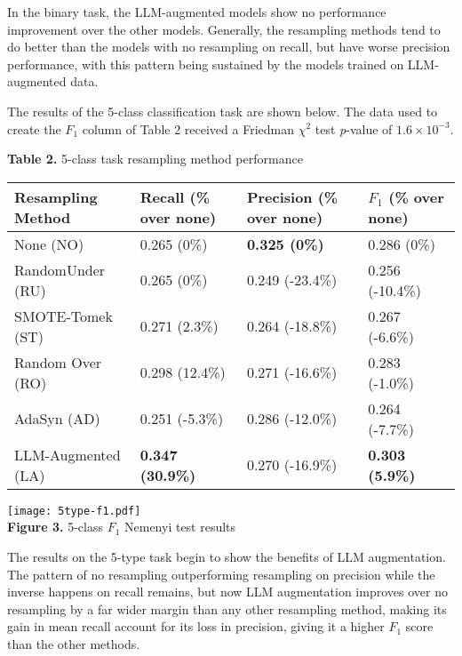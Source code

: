 \documentclass[runningheads]{llncs}
\newenvironment{nscenter}
 {\parskip=0pt\par\nopagebreak\centering}
 {\par\noindent\ignorespacesafterend}
\begin{document}
In the binary task, the LLM-augmented models show no performance improvement over the other models. Generally, the resampling methods tend to do better than the models with no resampling on recall, but have worse precision performance, with this pattern being sustained by the models trained on LLM-augmented data.

The results of the 5-class classification task are shown below. The data used to create the $F_1$ column of Table 2 received a Friedman $\chi^2$ test \emph{p}-value of $1.6 \times 10^{-3}$.
\begin{nscenter}
{\bf Table 2.} 5-class task resampling method performance\\

\begin{tabular}{|l|l|l|l|}
\hline
Resampling Method & Recall (\% over none) & Precision (\% over none) & $F_1$ (\% over none) \\\hline
 None (NO) & 0.265 (0\%) & {\bf 0.325 (0\%)} & 0.286 (0\%) \\\hline
 RandomUnder (RU) & 0.265 (0\%) & 0.249 (-23.4\%) & 0.256 (-10.4\%) \\\hline
 SMOTE-Tomek (ST) & 0.271 (2.3\%) & 0.264 (-18.8\%) & 0.267 (-6.6\%) \\\hline
 Random Over (RO) & 0.298 (12.4\%) & 0.271 (-16.6\%) & 0.283 (-1.0\%) \\\hline
 AdaSyn (AD) & 0.251 (-5.3\%) & 0.286 (-12.0\%) & 0.264 (-7.7\%) \\\hline
 LLM-Augmented (LA) & {\bf 0.347 (30.9\%)} & 0.270 (-16.9\%) & {\bf 0.303 (5.9\%)} \\\hline
\end{tabular}

\texttt{[image: 5type-f1.pdf]}\\
{\bf Figure 3.} 5-class $F_1$ Nemenyi test results\\
\end{nscenter}
The results on the 5-type task begin to show the benefits of LLM augmentation. The pattern of no resampling outperforming resampling on precision while the inverse happens on recall remains, but now LLM augmentation improves over no resampling by a far wider margin than any other resampling method, making its gain in mean recall account for its loss in precision, giving it a higher $F_1$ score than the other methods.
\end{document}
